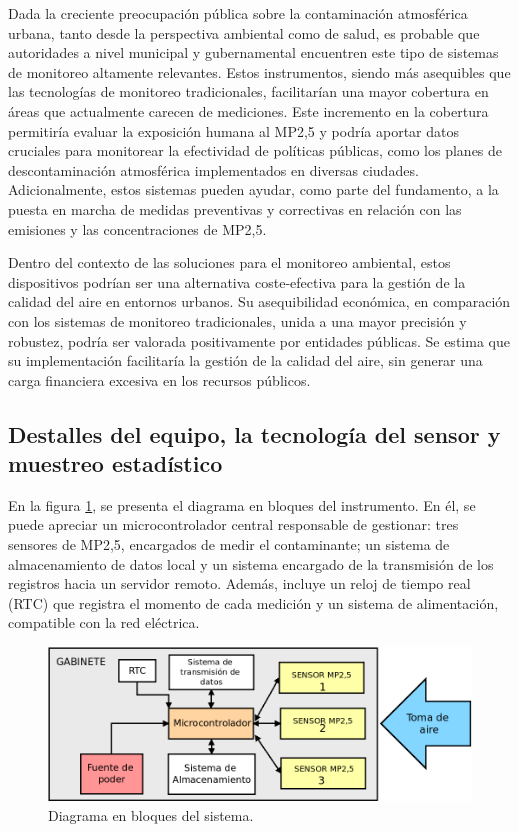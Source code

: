 Dada la creciente preocupación pública sobre la contaminación atmosférica urbana, tanto desde la perspectiva ambiental como de salud, es probable que autoridades a nivel municipal y gubernamental encuentren este tipo de sistemas de monitoreo altamente relevantes. Estos instrumentos, siendo más asequibles que las tecnologías de monitoreo tradicionales, facilitarían una mayor cobertura en áreas que actualmente carecen de mediciones. Este incremento en la cobertura permitiría evaluar la exposición humana al MP2,5 y podría aportar datos cruciales para monitorear la efectividad de políticas públicas, como los planes de descontaminación atmosférica implementados en diversas ciudades. Adicionalmente, estos sistemas pueden ayudar, como parte del fundamento, a la puesta en marcha de medidas preventivas y correctivas en relación con las emisiones y las concentraciones de MP2,5. 

Dentro del contexto de las soluciones para el monitoreo ambiental, estos dispositivos podrían ser una alternativa coste-efectiva para la gestión de la calidad del aire en entornos urbanos. Su asequibilidad económica, en comparación con los sistemas de monitoreo tradicionales, unida a una mayor precisión y robustez, podría ser valorada positivamente por entidades públicas. Se estima que su implementación facilitaría la gestión de la calidad del aire, sin generar una carga financiera excesiva en los recursos públicos.



\subsection{Destalles del equipo, la tecnología del sensor y muestreo estadístico}

En la figura \ref{fig:diagBloques}, se presenta el diagrama en bloques del instrumento. En él, se puede apreciar un microcontrolador central responsable de gestionar: tres sensores de MP2,5, encargados de medir el contaminante; un sistema de almacenamiento de datos local y un sistema encargado de la transmisión de los registros hacia un servidor remoto. Además, incluye un reloj de tiempo real (RTC) que registra el momento de cada medición y un sistema de alimentación, compatible con la red eléctrica.

\begin{figure}[htpb]
	\centering 
	\includegraphics[width=.9\textwidth]{./Figuras/diagBloques.png}
	\caption{Diagrama en bloques del sistema.}
	\label{fig:diagBloques}
\end{figure}

